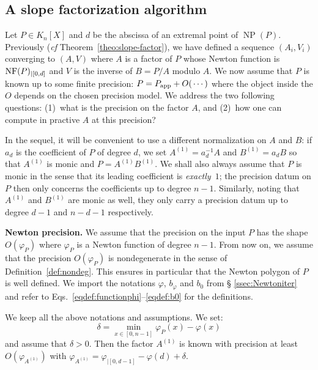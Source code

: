 \documentclass{sig-alternate-2013}
\DeclareMathOperator{\NP}{NP}
\newcommand{\NF}{\text{\rm NF}}
\newcommand{\app}{\textrm{app}}
\begin{document}
\subsection{A slope factorization algorithm}

Let $P \in K_n[X]$ and $d$ be the abscissa of an extremal point of 
$\NP(P)$. Previously (\emph{cf} Theorem~\ref{theo:slope-factor}), we 
have defined a sequence $(A_i, V_i)$ converging to $(A,V)$ where $A$ is 
a factor of $P$ whose Newton function is $\NF(P)_{|[0,d]}$ and $V$ is the inverse of $B = P/A$ modulo $A$.
We now assume that $P$ is known up to some finite precision: $P = P_\app + 
O(\hspace{0.5mm}\cdots)$ where the object inside the $O$ depends on the 
chosen precision model. We address the two following questions:
(1)~what is the precision on the factor $A$, and
(2)~how one can compute in practive $A$ at this precision?

In the sequel, it will be convenient to use a different normalization on 
$A$ and $B$: if $a_d$ is the coefficient of $P$ of degree $d$, we set
$A^{(1)} = a_d^{-1} A$ and $B^{(1)} = a_d B$
so that $A^{(1)}$ is monic and $P = A^{(1)} B^{(1)}$. We shall also 
always assume that $P$ is monic in the sense that its leading
coefficient is \emph{exactly}~$1$; the precision datum on $P$ then 
only concerns the coefficients up to degree $n{-}1$. Similarly, noting
that $A^{(1)}$ and $B^{(1)}$ are monic as well, they only carry a
precision datum up to degree $d{-}1$ and $n{-}d{-}1$ respectively.

\medskip

\noindent
{\bf Newton precision.}
We assume that the precision on the input $P$ has the shape 
$O(\varphi_P)$ where $\varphi_P$ is a Newton function of degree 
$n{-}1$. From now on, we assume that the precision $O(\varphi_P)$ 
is nondegenerate in the sense of Definition~\ref{def:nondeg}. This
ensures in particular that the Newton polygon of $P$ is well defined. 
We import the notations $\varphi$, $b_\varphi$ and $b_0$ from \S 
\ref{ssec:Newtoniter} and refer to 
Eqs.~\eqref{eqdef:functionphi}--\eqref{eqdef:b0} for the definitions.

\begin{prop}
\label{prop:Newtonprecslope}
We keep all the above notations and assumptions. We set:
$$\delta = \min_{x \in [0,n{-}1]} \varphi_P(x) - \varphi(x)$$
and assume that $\delta > 0$. 
Then the factor $A^{(1)}$ is known with precision at least 
$O(\varphi_{A^{(1)}})$ with
$\varphi_{A^{(1)}} = \varphi_{|[0,d{-}1]} - \varphi(d) + \delta$.
\end{prop}
\end{document}
